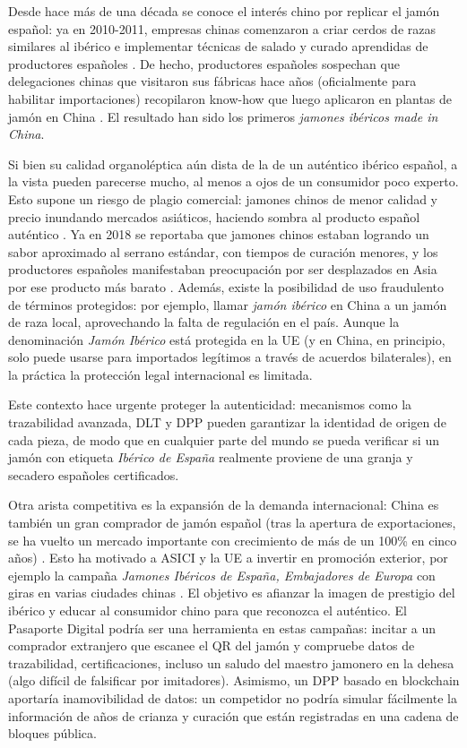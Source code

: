 Desde hace más de una década se conoce el interés chino por replicar el jamón español: ya en 2010-2011, empresas chinas comenzaron a criar cerdos de razas similares al ibérico e implementar técnicas de salado y curado aprendidas de productores españoles \cite{noauthor_jamon_2011}. De hecho, productores españoles sospechan que delegaciones chinas que visitaron sus fábricas hace años (oficialmente para habilitar importaciones) recopilaron know-how que luego aplicaron en plantas de jamón en China . El resultado han sido los primeros \textit{jamones ibéricos made in China}\cite{noauthor_jamon_2011}.

Si bien su calidad organoléptica aún dista de la de un auténtico ibérico español, a la vista pueden parecerse mucho, al menos a ojos de un consumidor poco experto. Esto supone un riesgo de plagio comercial: jamones chinos de menor calidad y precio inundando mercados asiáticos, haciendo sombra al producto español auténtico \cite{noauthor_jamon_2011}. Ya en 2018 se reportaba que jamones chinos estaban logrando un sabor aproximado al serrano estándar, con tiempos de curación menores, y los productores españoles manifestaban preocupación por ser desplazados en Asia por ese producto más barato \cite{noauthor_china_nodate}. Además, existe la posibilidad de uso fraudulento de términos protegidos: por ejemplo, llamar \textit{jamón ibérico} en China a un jamón de raza local, aprovechando la falta de regulación en el país. Aunque la denominación \textit{Jamón Ibérico} está protegida en la UE (y en China, en principio, solo puede usarse para importados legítimos a través de acuerdos bilaterales), en la práctica la protección legal internacional es limitada.

Este contexto hace urgente proteger la autenticidad: mecanismos como la trazabilidad avanzada, DLT y DPP pueden garantizar la identidad de origen de cada pieza, de modo que en cualquier parte del mundo se pueda verificar si un jamón con etiqueta \textit{Ibérico de España} realmente proviene de una granja y secadero españoles certificados.

Otra arista competitiva es la expansión de la demanda internacional: China es también un gran comprador de jamón español (tras la apertura de exportaciones, se ha vuelto un mercado importante con crecimiento de  más de un 100\% en cinco años) \cite{depares_china_2024}\cite{bonet_preguntar_2023}. Esto ha motivado a ASICI y la UE a invertir en promoción exterior, por ejemplo la campaña \textit{Jamones Ibéricos de España, Embajadores de Europa} con giras en varias ciudades chinas \cite{depares_china_2024}. El objetivo es afianzar la imagen de prestigio del ibérico y educar al consumidor chino para que reconozca el auténtico. El Pasaporte Digital podría ser una herramienta en estas campañas: incitar a un comprador extranjero que escanee el QR del jamón y compruebe datos de trazabilidad, certificaciones, incluso un saludo del maestro jamonero en la dehesa (algo difícil de falsificar por imitadores). Asimismo, un DPP basado en blockchain aportaría inamovibilidad de datos: un competidor no podría simular fácilmente la información de años de crianza y curación que están registradas en una cadena de bloques pública.

